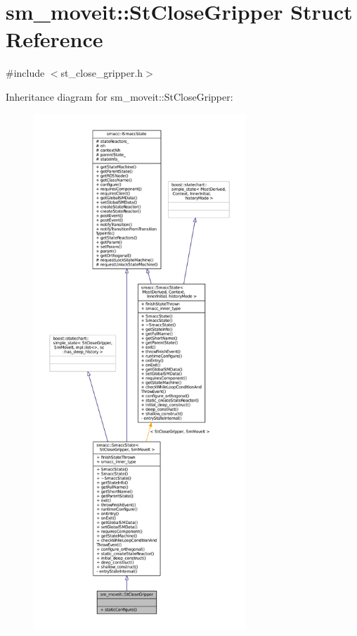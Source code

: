 \hypertarget{structsm__moveit_1_1StCloseGripper}{}\section{sm\+\_\+moveit\+:\+:St\+Close\+Gripper Struct Reference}
\label{structsm__moveit_1_1StCloseGripper}


{\ttfamily \#include $<$st\+\_\+close\+\_\+gripper.\+h$>$}



Inheritance diagram for sm\+\_\+moveit\+:\+:St\+Close\+Gripper\+:
\nopagebreak
\begin{figure}[H]
\begin{center}
\leavevmode
\includegraphics[height=550pt]{structsm__moveit_1_1StCloseGripper__inherit__graph}
\end{center}
\end{figure}


